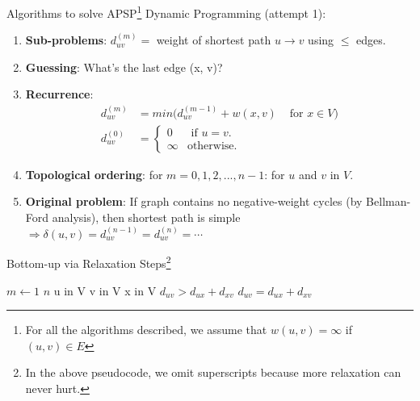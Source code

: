 \documentclass{beamer}
\begin{document}
\begin{frame}{Algorithms to solve APSP\footnote{\scriptsize For all the algorithms described, we assume that $w(u, v) = \infty$ if $(u, v) \in E$}}
    Dynamic Programming (attempt 1):
    \begin{enumerate}
    \scriptsize
        \item \textbf{Sub-problems}: $d_{uv}^{(m)} =$ weight of shortest path $u \rightarrow v$ using $\leq$ edges.
        \item \textbf{Guessing}: What's the last edge (x, v)?
        \item \textbf{Recurrence}:
        \begin{equation*}
            \begin{align*}
                d_{uv}^{(m)} &= min( d_{uv}^{(m - 1)} + w(x, v) & \text{ for } x \in V) \\
                d_{uv}^{(0)} &=
                    \begin{cases}
                        0 & \text{ if } u = v. \\
                        \infty & \text{otherwise}.
                    \end{cases}
            \end{align*}
        \end{equation*}
        \item \textbf{Topological ordering}: for $m = 0, 1, 2, . . . , n - 1$: for $u$ and $v$ in $V$.
        \item \textbf{Original problem}: If graph contains no negative-weight cycles (by Bellman-Ford analysis), then shortest path is simple $\Rightarrow \delta(u, v) = d_{uv}^{(n - 1)} = d_{uv}^{(n)} = \cdots$
    \end{enumerate}
\end{frame}

\begin{frame}{Bottom-up via Relaxation Steps\footnote{{\scriptsize In the above pseudocode, we omit superscripts because more relaxation can never hurt.}}}
    \begin{codebox}
        \li \For $m \gets 1$ \To $n$ 
        \li \hspace{0.5cm} \For u in V
        \li \hspace{1.0cm} \For v in V
        \li \hspace{1.5cm} \For x in V
        \li \hspace{2.0cm} \If $d_{uv} > d_{ux} + d_{xv}$
        \li \hspace{2.5cm} $d_{uv} = d_{ux} + d_{xv}$
    \end{codebox}
\end{frame}
\end{document}
